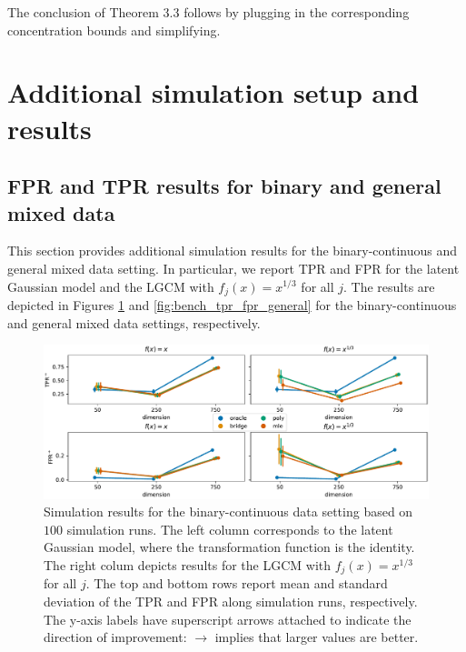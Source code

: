 The conclusion of Theorem 3.3
follows by plugging in the corresponding concentration bounds and simplifying.


\section{Additional simulation setup and results}\label{sec::additional_setup_results}

\subsection{FPR and TPR results for binary and general mixed data}

This section provides additional simulation results for the binary-continuous and general mixed data setting. In particular, we report TPR and FPR for the latent Gaussian model and the LGCM with \(f_j(x) = x^{1/3}\) for all \(j\). The results are depicted in Figures \ref{fig:bench_tpr_fpr_binary} and \ref{fig:bench_tpr_fpr_general} for the binary-continuous and general mixed data settings, respectively.
\begin{figure}
    \centering
    \includegraphics[width=\textwidth]{Figures/binary_fpr_tpr.pdf}
    \caption{Simulation results for the binary-continuous data setting based on \(100\) simulation runs. The left column corresponds to the latent Gaussian model, where the transformation function is the identity. The right colum depicts results for the LGCM with \(f_j(x) = x^{1/3}\) for all \(j\). The top and bottom rows report mean and standard deviation of the TPR and FPR along simulation runs, respectively. The y-axis labels have superscript arrows attached to indicate the direction of improvement: \(\rightarrow\) implies that larger values are better.}
    \label{fig:bench_tpr_fpr_binary}
\end{figure}

